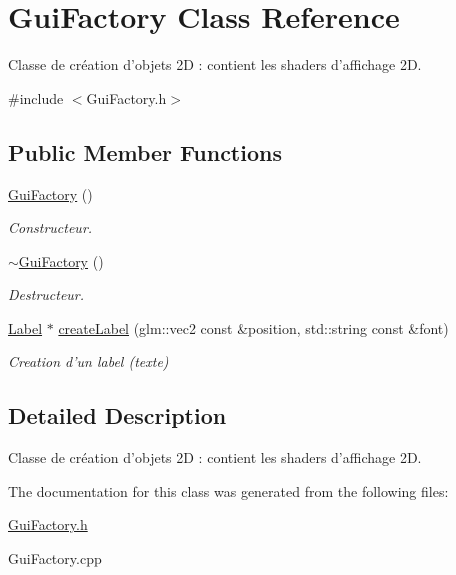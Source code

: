 \hypertarget{classGuiFactory}{\section{Gui\+Factory Class Reference}
\label{classGuiFactory}
}


Classe de création d'objets 2\+D \+: contient les shaders d'affichage 2\+D.  




{\ttfamily \#include $<$Gui\+Factory.\+h$>$}

\subsection*{Public Member Functions}
\begin{DoxyCompactItemize}
\item 
\hypertarget{classGuiFactory_a3d7afcd225a44171f4107d67fdfda2c5}{\hyperlink{classGuiFactory_a3d7afcd225a44171f4107d67fdfda2c5}{Gui\+Factory} ()}\label{classGuiFactory_a3d7afcd225a44171f4107d67fdfda2c5}

\begin{DoxyCompactList}\small\item\em Constructeur. \end{DoxyCompactList}\item 
\hypertarget{classGuiFactory_a77f5f87312431f37b1c279db09b00a46}{\hyperlink{classGuiFactory_a77f5f87312431f37b1c279db09b00a46}{$\sim$\+Gui\+Factory} ()}\label{classGuiFactory_a77f5f87312431f37b1c279db09b00a46}

\begin{DoxyCompactList}\small\item\em Destructeur. \end{DoxyCompactList}\item 
\hypertarget{classGuiFactory_ae37a3ad8191728d30ab050aec876787e}{\hyperlink{classLabel}{Label} $\ast$ \hyperlink{classGuiFactory_ae37a3ad8191728d30ab050aec876787e}{create\+Label} (glm\+::vec2 const \&position, std\+::string const \&font)}\label{classGuiFactory_ae37a3ad8191728d30ab050aec876787e}

\begin{DoxyCompactList}\small\item\em Creation d'un label (texte) \end{DoxyCompactList}\end{DoxyCompactItemize}


\subsection{Detailed Description}
Classe de création d'objets 2\+D \+: contient les shaders d'affichage 2\+D. 

The documentation for this class was generated from the following files\+:\begin{DoxyCompactItemize}
\item 
\hyperlink{GuiFactory_8h}{Gui\+Factory.\+h}\item 
Gui\+Factory.\+cpp\end{DoxyCompactItemize}
